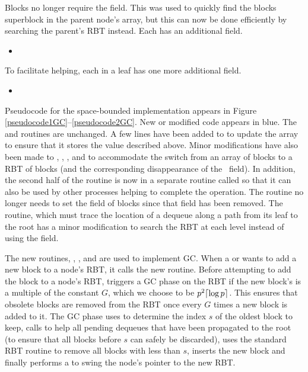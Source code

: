 Blocks no longer require the  field.  This was used to quickly find the blocks 
superblock in the parent node's  array, but this can now be done efficiently 
by searching the parent's  RBT instead.
Each  has an additional field.
\begin{itemize}
\item {}  
\end{itemize}
To facilitate helping, each  in a leaf has one more additional field.
\begin{itemize}
\item {}  
\end{itemize}


Pseudocode for the space-bounded implementation appears in Figure \ref{pseudocode1GC}--\ref{pseudocode2GC}.
New or modified code appears in blue.
The  and  routines are unchanged.
A few lines have been added to  to update the  array
to ensure that it stores the value described above.
Minor modifications have also
been made to , , ,  and 
to accommodate  the switch from an array of blocks to a RBT of blocks (and the corresponding disappearance
of the \head\ field).
In addition, the second half of the  routine is now in a
separate routine called  so that it can also be used by other processes
helping to complete the operation.
The  routine no longer needs to set the  field of blocks since
that field has been removed.
The  routine, which must trace the location of a dequeue along
a path from its leaf to the root has a minor modification to search the  RBT at 
each level instead of using the  field.

The new routines, , ,  and  are
used to implement GC.
When a  or  wants to add a new block to a node's  RBT,
it calls the new  routine.
Before attempting to add the block to a node's RBT,  triggers a GC phase on the RBT if 
the new block's  is a multiple of the constant $G$, which we choose to be $p^2\lceil \log p \rceil$.
This ensures that obsolete blocks are removed from the RBT once every $G$ times a new block is added to it.
The GC phase uses  to determine the index $s$ of the oldest block to keep,
calls  to help all pending dequeues that have been propagated to the root
(to ensure that all blocks before $s$ can safely be discarded),
uses the standard RBT  routine \cite{Tar83}
to remove all blocks with  less than $s$,
inserts the new block
and finally performs a  to swing the node's  pointer to the new RBT.


